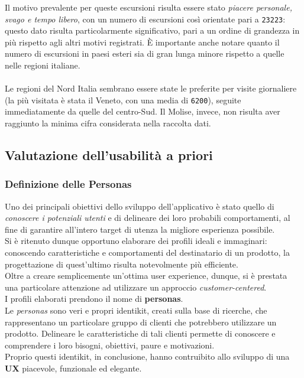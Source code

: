 \documentclass{natourDoc}
\begin{document}
Il motivo prevalente per queste escursioni risulta essere stato \textit{piacere personale, svago e tempo libero}, con un numero
di escursioni così orientate pari a \texttt{23223}: questo dato risulta particolarmente significativo, pari a un ordine
di grandezza in più rispetto agli altri motivi registrati. È importante anche notare quanto il numero di escursioni in paesi
esteri sia di gran lunga minore rispetto a quelle nelle regioni italiane.\\\\
Le regioni del Nord Italia sembrano essere state le preferite per visite giornaliere (la più visitata è stata il Veneto, con una media di
\texttt{6200}), seguite immediatamente da quelle del centro-Sud. Il Molise, invece, non risulta aver raggiunto
la minima cifra considerata nella raccolta dati.\\

\subsection{Valutazione dell'usabilità a priori}

\subsubsection{Definizione delle Personas}
Uno dei principali obiettivi dello sviluppo dell'applicativo è stato quello di \textit{conoscere i potenziali utenti} 
e di delineare dei loro probabili comportamenti, al fine di garantire all'intero target di utenza la migliore esperienza 
possibile. \\
Si è ritenuto dunque opportuno elaborare dei profili ideali e immaginari: conoscendo caratteristiche e comportamenti del destinatario 
di un prodotto, la progettazione di quest'ultimo risulta notevolmente più efficiente. \\
Oltre a creare semplicemente un'ottima user experience, dunque, si è prestata una particolare attenzione ad utilizzare un approccio \textit{customer-centered}. \\
I profili elaborati prendono il nome di \textbf{personas}. \\
Le \textit{personas} sono veri e propri identikit, creati sulla base di ricerche, che rappresentano un particolare
gruppo di clienti che potrebbero utilizzare un prodotto. Delineare le caratteristiche di tali clienti permette di conoscere e comprendere i 
loro bisogni, obiettivi, paure e motivazioni.\\
Proprio questi identikit, in conclusione, hanno contruibito allo sviluppo di una \textbf{UX} piacevole, funzionale ed elegante.
\end{document}
